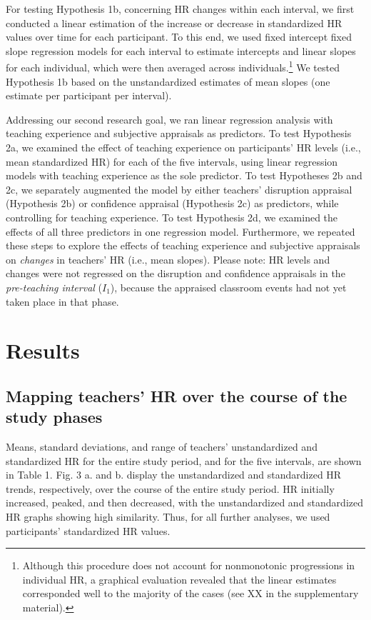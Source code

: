 \documentclass[preprint, 3p,
sort,]{elsarticle} %
\begin{document}
For testing Hypothesis 1b, concerning HR changes within each interval,
we first conducted a linear estimation of the increase or decrease in
standardized HR values over time for each participant. To this end, we
used fixed intercept fixed slope regression models
\citep{gelman2006data} for each interval to estimate intercepts and
linear slopes for each individual, which were then averaged across
individuals.\footnote{Although this procedure does not account for
  nonmonotonic progressions in individual HR, a graphical evaluation
  revealed that the linear estimates corresponded well to the majority
  of the cases (see XX in the supplementary material).} We tested
Hypothesis 1b based on the unstandardized estimates of mean slopes (one
estimate per participant per interval).

Addressing our second research goal, we ran linear regression analysis
with teaching experience and subjective appraisals as predictors. To
test Hypothesis 2a, we examined the effect of teaching experience on
participants' HR levels (i.e., mean standardized HR) for each of the
five intervals, using linear regression models with teaching experience
as the sole predictor. To test Hypotheses 2b and 2c, we separately
augmented the model by either teachers' disruption appraisal (Hypothesis
2b) or confidence appraisal (Hypothesis 2c) as predictors, while
controlling for teaching experience. To test Hypothesis 2d, we examined
the effects of all three predictors in one regression model.
Furthermore, we repeated these steps to explore the effects of teaching
experience and subjective appraisals on \emph{changes} in teachers' HR
(i.e., mean slopes). Please note: HR levels and changes were not
regressed on the disruption and confidence appraisals in the
\emph{pre-teaching interval} (\(I_1\)), because the appraised classroom
events had not yet taken place in that phase.

\section{Results}\label{results}

\subsection{Mapping teachers' HR over the course of the study
phases}\label{mapping-teachers-hr-over-the-course-of-the-study-phases}

Means, standard deviations, and range of teachers' unstandardized and
standardized HR for the entire study period, and for the five intervals,
are shown in Table 1. Fig. 3 a. and b. display the unstandardized and
standardized HR trends, respectively, over the course of the entire
study period. HR initially increased, peaked, and then decreased, with
the unstandardized and standardized HR graphs showing high similarity.
Thus, for all further analyses, we used participants' standardized HR
values.
\end{document}
